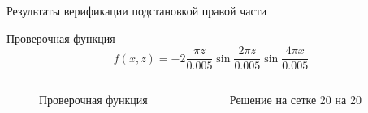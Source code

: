 \documentclass[ignoreonframetext,unicode]{beamer}
\begin{document}
\begin{frame}{Результаты верификации подстановкой правой части}
		\vspace*{-1mm}
	\begin{block}{Проверочная функция}
		\begin{equation*}
			f(x, z) = -2 \frac{\pi z}{0.005} \sin{\frac{2 \pi z}{0.005}} \sin{\frac{4 \pi x}{0.005}}
			\label{check_func_2}
		\end{equation*}
	\end{block}
	
	\vspace*{-2mm}
	\begin{columns}
		
		
		\begin{figure}[!htbp]
			\caption{Проверочная функция}
			\label{check_func_2_pic}
		\end{figure}
		
		\begin{figure}[!htbp]
			\caption{Решение на сетке 20 на 20}
			\label{res_check_func_2}
		\end{figure}
		

\end{columns}
\end{frame}
\end{document}
